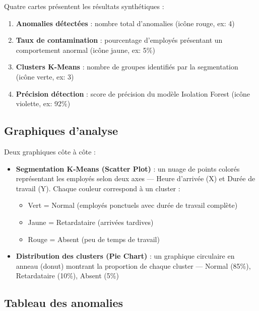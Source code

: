 \documentclass[12pt,a4paper]{report}
\begin{document}
Quatre cartes présentent les résultats synthétiques :
\begin{enumerate}
    \item \textbf{Anomalies détectées} : nombre total d'anomalies (icône rouge, ex: 4)
    \item \textbf{Taux de contamination} : pourcentage d'employés présentant un comportement anormal (icône jaune, ex: 5\%)
    \item \textbf{Clusters K-Means} : nombre de groupes identifiés par la segmentation (icône verte, ex: 3)
    \item \textbf{Précision détection} : score de précision du modèle Isolation Forest (icône violette, ex: 92\%)
\end{enumerate}

\subsection{Graphiques d'analyse}

Deux graphiques côte à côte :

\begin{itemize}
    \item \textbf{Segmentation K-Means (Scatter Plot)} : un nuage de points colorés représentant les employés selon deux axes — \og Heure d'arrivée \fg{} (X) et \og Durée de travail \fg{} (Y). Chaque couleur correspond à un cluster :
    \begin{itemize}
        \item Vert = Normal (employés ponctuels avec durée de travail complète)
        \item Jaune = Retardataire (arrivées tardives)
        \item Rouge = Absent (peu de temps de travail)
    \end{itemize}
    \item \textbf{Distribution des clusters (Pie Chart)} : un graphique circulaire en anneau (donut) montrant la proportion de chaque cluster — Normal (85\%), Retardataire (10\%), Absent (5\%)
\end{itemize}

\subsection{Tableau des anomalies}
\end{document}
